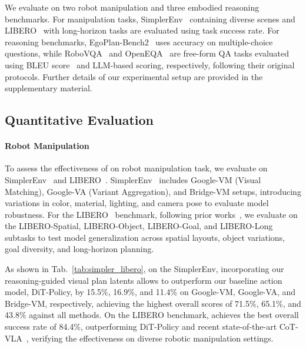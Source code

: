 We evaluate \ours{} on two robot manipulation and three embodied reasoning benchmarks. For manipulation tasks, SimplerEnv~\cite{li24simpler} containing diverse scenes and LIBERO~\cite{liu2023libero} with long-horizon tasks are evaluated using task success rate. For reasoning benchmarks, EgoPlan-Bench2~\cite{qiu2024egoplan} uses accuracy on multiple-choice questions, while RoboVQA~\cite{sermanet2024robovqa} and OpenEQA~\cite{majumdar2023openeqa} are free-form QA tasks evaluated using BLEU score~\cite{papineni2002bleu} and LLM-based scoring, respectively, following their original protocols. Further details of our experimental setup are provided in the supplementary material.

\subsection{Quantitative Evaluation}
\paragraph{Robot Manipulation}



To assess the effectiveness of \ours{} on robot manipulation task, we evaluate on SimplerEnv~\cite{li24simpler} and LIBERO~\cite{liu2023libero}. SimplerEnv~\cite{li24simpler} includes Google-VM (Visual Matching), Google-VA (Variant Aggregation), and Bridge-VM setups, introducing variations in color, material, lighting, and camera pose to evaluate model robustness. For the LIBERO~\cite{liu2023libero} benchmark, following prior works~\cite{kim24openvla, zhao2025cot}, we evaluate on the LIBERO-Spatial, LIBERO-Object, LIBERO-Goal, and LIBERO-Long subtasks to test model generalization across spatial layouts, object variations, goal diversity, and long-horizon planning.

As shown in Tab.~\ref{tab:simpler_libero}, on the SimplerEnv, incorporating our reasoning-guided visual plan latents allows \ours{} to outperform our baseline action model, DiT-Policy, by 15.5\%, 16.9\%, and 11.4\% on Google-VM, Google-VA, and Bridge-VM, respectively, achieving the highest overall scores of 71.5\%, 65.1\%, and 43.8\% against all methods. On the LIBERO benchmark, \ours{} achieves the best overall success rate of 84.4\%, outperforming DiT-Policy and recent state-of-the-art CoT-VLA~\cite{zhao2025cot}, verifying the effectiveness on diverse robotic manipulation settings.






